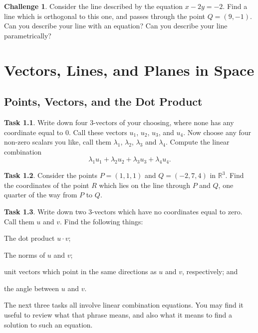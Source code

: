 \documentclass{tufte-book}
\theoremstyle{definition}
\newtheorem{task}{Task}
\newtheorem{challenge}[task]{Challenge}
\begin{document}
\begin{challenge}
Consider the line described by the equation $x -2y = -2$. Find a line which is orthogonal to this one, and passes through the point $Q=(9,-1)$. Can you describe your line with an equation? Can you describe your line parametrically?
\end{challenge}

\chapter{Vectors, Lines, and Planes in Space}
\label{ch:two}

\section*{Points, Vectors, and the Dot Product}

\begin{task}
Write down four $3$-vectors of your choosing, where none has any coordinate equal to $0$. Call these vectors $u_1$, $u_2$, $u_3$, and $u_4$. Now choose any four non-zero scalars you like, call them $\lambda_1$, $\lambda_2$, $\lambda_3$ and $\lambda_4$. Compute the linear combination
\[
\lambda_1 u_1 + \lambda_2 u_2 + \lambda_3 u_3 + \lambda_4 u_4. 
\]
\end{task}

\begin{task}
Consider the points $P = (1,1,1)$ and $Q = (-2,7,4)$ in $\mathbb{R}^3$.
Find the coordinates of the point $R$ which lies on the line through $P$ and $Q$, one quarter of the way from $P$ to $Q$.
\end{task}

\begin{task}
Write down two $3$-vectors which have no coordinates equal to zero. Call them $u$ and $v$. Find the following things:
\begin{compactitem}
\item The dot product $u\cdot v$;
\item The norms of $u$ and $v$;
\item unit vectors which point in the same directions as $u$ and $v$, respectively; and
\item the angle between $u$ and $v$.
\end{compactitem}
\end{task}

The next three tasks all involve linear combination equations. You may find it useful to review what that phrase means, and also what it means to find a solution to such an equation.
\end{document}
